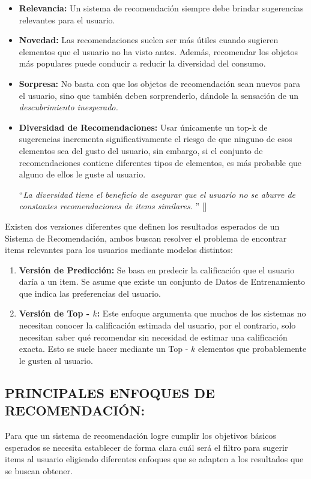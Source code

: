 \begin{itemize}
    \item \textbf{Relevancia: }Un sistema de recomendación siempre debe brindar sugerencias relevantes para el usuario.
    \item \textbf{Novedad: }  Las recomendaciones suelen ser más útiles cuando sugieren elementos que el usuario no ha visto antes. Además, recomendar los objetos más populares puede conducir a reducir la diversidad del consumo.
    \item \textbf{Sorpresa: } No basta con que los objetos de recomendación sean nuevos para el usuario, sino que también deben sorprenderlo, dándole la sensación de un \textit{descubrimiento inesperado.}
    \item \textbf{Diversidad de Recomendaciones: } Usar únicamente un top-k de sugerencias incrementa significativamente el riesgo de que ninguno de esos elementos sea del gusto del usuario, sin embargo, si el conjunto de recomendaciones contiene diferentes tipos de elementos, es más probable que alguno de ellos le guste al usuario.

   \enquote{\textit{La diversidad tiene el beneficio de asegurar que el usuario no se aburre de constantes recomendaciones de items similares. }} [\cite{Aggarwal2016}]
\end{itemize}

Existen dos versiones diferentes que definen los resultados esperados de un Sistema de Recomendación, ambos buscan resolver el problema de encontrar items relevantes para los usuarios mediante modelos distintos:


\begin{enumerate}
    \item \textbf{Versión de Predicción: } Se basa en predecir la calificación que el usuario daría a un item. Se asume que existe un conjunto de Datos de Entrenamiento que indica las preferencias del usuario.
    \item \textbf{Versión de Top - $k$: } Este enfoque argumenta que muchos de los sistemas no necesitan conocer la calificación estimada del usuario, por el contrario, solo necesitan saber qué recomendar sin necesidad de estimar una calificación exacta. Esto se suele hacer mediante un Top - $k$ elementos que probablemente le gusten al usuario.
\end{enumerate}

\newpage
\thispagestyle{plain}
\vspace*{0.2cm}

\subsection{PRINCIPALES ENFOQUES DE RECOMENDACIÓN: }
Para que un sistema de recomendación logre cumplir los objetivos básicos esperados se necesita establecer de forma clara cuál será el filtro para sugerir items al usuario eligiendo diferentes enfoques que se adapten a los resultados que se buscan obtener.

